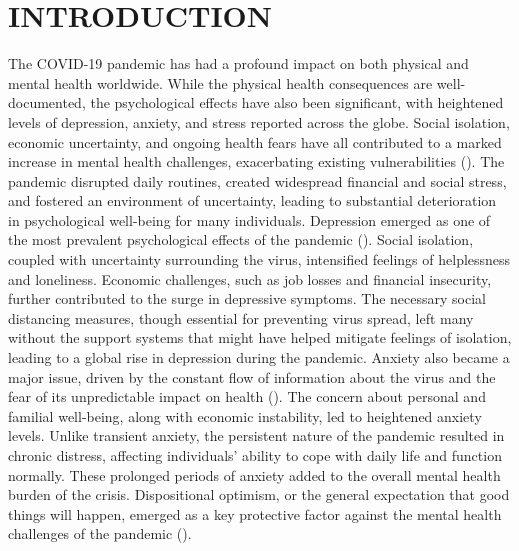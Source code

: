 \documentclass[a4paper]{article}
\begin{document}
\section{INTRODUCTION}
\vspace{0.5em}
The COVID-19 pandemic has had a profound impact on both physical and mental health worldwide.\newline
While the physical health consequences are well-documented, the psychological effects have also been significant, with heightened levels of depression, anxiety, and stress reported across the globe.
Social isolation, economic uncertainty, and ongoing health fears have all contributed to a marked increase in mental health challenges, exacerbating existing vulnerabilities (\citet{PsychologicalImpactQuarantine}).
The pandemic disrupted daily routines, created widespread financial and social stress, and fostered an environment of uncertainty, leading to substantial deterioration in psychological well-being for many individuals.
\vspace{0.5em}\newline
Depression emerged as one of the most prevalent psychological effects of the pandemic (\citet{PrevalenceDepressionDuringCOVID-19}).
Social isolation, coupled with uncertainty surrounding the virus, intensified feelings of helplessness and loneliness.
Economic challenges, such as job losses and financial insecurity, further contributed to the surge in depressive symptoms.
The necessary social distancing measures, though essential for preventing virus spread,
left many without the support systems that might have helped mitigate feelings of isolation, leading to a global rise in depression during the pandemic.
\vspace{0.5em}\newline
Anxiety also became a major issue, driven by the constant flow of information about the virus and the fear of its unpredictable impact on health (\citet{Frontiers2021StressAnxietyEconomicInsecurity}).
The concern about personal and familial well-being, along with economic instability, led to heightened anxiety levels.
Unlike transient anxiety, the persistent nature of the pandemic resulted in chronic distress, affecting individuals' ability to cope with daily life and function normally.
These prolonged periods of anxiety added to the overall mental health burden of the crisis.
\vspace{0.5em}\newline
Dispositional optimism, or the general expectation that good things will happen, emerged as a key protective factor against the mental health challenges of the pandemic (\citet{Carver2010WileyInterdisciplinaryReviews}).
\end{document}
